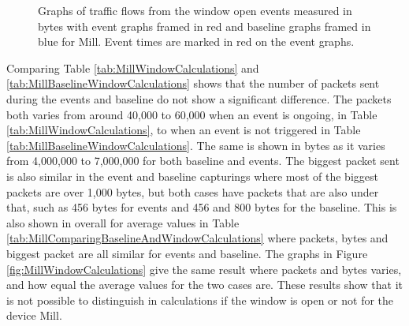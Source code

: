 \begin{figure}[H]
\begin{subfigure}[b]{0.47\textwidth}
        \centering
    \end{subfigure}
        \begin{subfigure}[b]{0.47\textwidth}
        \centering
    \end{subfigure}
    \begin{subfigure}[b]{0.47\textwidth}
        \centering
    \end{subfigure}
    \begin{subfigure}[b]{0.47\textwidth}
        \centering
    \end{subfigure}
    \hspace{0.6cm}
    \begin{subfigure}[b]{0.47\textwidth}
    \centering
        \end{subfigure}
    \caption{Graphs of traffic flows from the window open events measured in bytes with event graphs framed in red and baseline graphs framed in blue for Mill. Event times are marked in red on the event graphs.}  
    \label{fig:MillWindowBytes2}
\end{figure}

Comparing Table \ref{tab:MillWindowCalculations} and \ref{tab:MillBaselineWindowCalculations} shows that the number of packets sent during the events and baseline do not show a significant difference. The packets both varies from around 40,000 to 60,000 when an event is ongoing, in Table \ref{tab:MillWindowCalculations}, to when an event is not triggered in Table \ref{tab:MillBaselineWindowCalculations}. The same is shown in bytes as it varies from 4,000,000 to 7,000,000 for both baseline and events. The biggest packet sent is also similar in the event and baseline capturings where most of the biggest packets are over 1,000 bytes, but both cases have packets that are also under that, such as 456 bytes for events and 456 and 800 bytes for the baseline. This is also shown in overall for average values in Table \ref{tab:MillComparingBaselineAndWindowCalculations} where packets, bytes and biggest packet are all similar for events and baseline. The graphs in Figure \ref{fig:MillWindowCalculations} give the same result where packets and bytes varies, and how equal the average values for the two cases are. These results show that it is not possible to distinguish in calculations if the window is open or not for the device Mill. 

